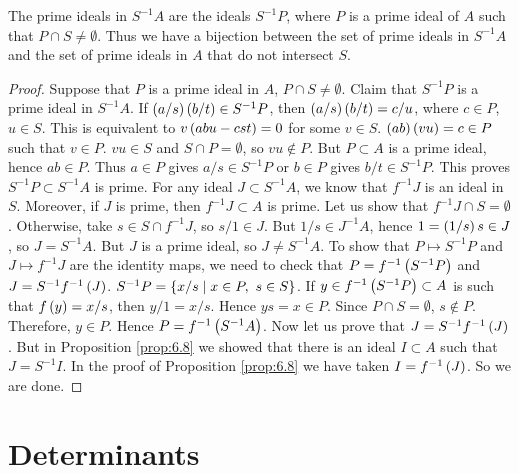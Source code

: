 \begin{theorem}
\label{thm:6.9}
The prime ideals in $ S^{-1}A $ are the ideals $ S^{-1}P $, where $ P $ is a prime ideal of $ A $ such that $ P \cap S \ne \emptyset $. Thus we have a bijection between the set of prime ideals in $ S^{-1}A $ and the set of prime ideals in $ A $ that do not intersect $ S $.
\end{theorem}

\begin{proof}
Suppose that $ P $ is a prime ideal in $ A $, $ P \cap S \ne \emptyset $. Claim that $ S^{-1}P $ is a prime ideal in $ S^{-1}A $. If $ \left( a / s \right)\left( b / t \right) \in S^{-1}P $, then $ \left( a / s \right)\left( b / t \right) = c / u $, where $ c \in P $, $ u \in S $. This is equivalent to $ v\left( abu - cst \right) = 0 $ for some $ v \in S $. $ \left( ab \right)\left( vu \right) = c \in P $ such that $ v \in P $. $ vu \in S $ and $ S \cap P = \emptyset $, so $ vu \notin P $. But $ P \subset A $ is a prime ideal, hence $ ab \in P $. Thus $ a \in P $ gives $ a / s \in S^{-1}P $ or $ b \in P $ gives $ b / t \in S^{-1}P $. This proves $ S^{-1}P \subset S^{-1}A $ is prime. For any ideal $ J \subset S^{-1}A $, we know that $ f^{-1}J $ is an ideal in $ S $. Moreover, if $ J $ is prime, then $ f^{-1}J \subset A $ is prime. Let us show that $ f^{-1}J \cap S = \emptyset $. Otherwise, take $ s \in S \cap f^{-1}J $, so $ s / 1 \in J $. But $ 1 / s \in J^{-1}A $, hence $ 1 = \left( 1 / s \right)s \in J $, so $ J = S^{-1}A $. But $ J $ is a prime ideal, so $ J \ne S^{-1}A $. To show that $ P \mapsto S^{-1}P $ and $ J \mapsto f^{-1}J $ are the identity maps, we need to check that $ P = f^{-1}\left( S^{-1}P \right) $ and $ J = S^{-1}f^{-1}\left( J \right) $. $ S^{-1}P = \left\{ x / s \mid x \in P, \ s \in S \right\} $. If $ y \in f^{-1}\left( S^{-1}P \right) \subset A $  is such that $ f\left( y \right) = x / s $, then $ y / 1 = x / s $. Hence $ ys = x \in P $. Since $ P \cap S = \emptyset $, $ s \notin P $. Therefore, $ y \in P $. Hence $ P = f^{-1}\left( S^{-1}A \right) $. Now let us prove that $ J = S^{-1}f^{-1}\left( J \right) $. But in Proposition \ref{prop:6.8} we showed that there is an ideal $ I \subset A $ such that $ J = S^{-1}I $. In the proof of Proposition \ref{prop:6.8} we have taken $ I = f^{-1}\left( J \right) $. So we are done.
\end{proof}

\pagebreak

\section{Determinants}


